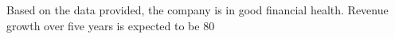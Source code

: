 

Based on the data provided, the company is in good financial health. Revenue growth over five years is expected to be 80%